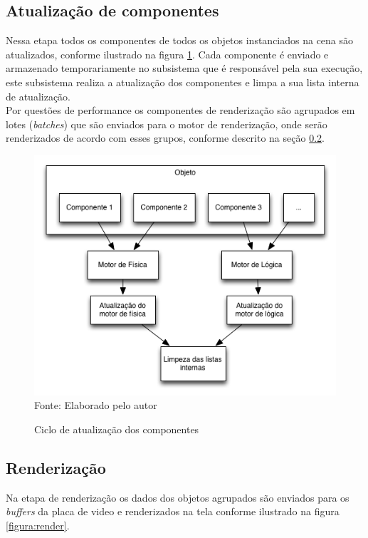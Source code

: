 \documentclass[12pt,	openright, twoside,	a4paper, english, french, spanish, brazil]{abntex2}
\begin{document}
\subsection{Atualização de componentes}
Nessa etapa todos os componentes de todos os objetos instanciados na cena são atualizados, conforme ilustrado na figura \ref{figura:update}. Cada componente é enviado e armazenado temporariamente no subsistema que é responsável pela sua execução, este subsistema realiza a atualização dos componentes e limpa a sua lista interna de atualização. \\
Por questões de performance os componentes de renderização são agrupados em lotes (\textit{batches}) que são enviados para o motor de renderização, onde serão renderizados de acordo com esses grupos, conforme descrito na seção \ref{sec: renderizacao}.

\begin{figure}[H]
\centering
\caption{Ciclo de atualização dos componentes}
\includegraphics[width=12cm]{imagens/update.png}
\\
\small{Fonte: Elaborado pelo autor}
\label{figura:update}
\end{figure}

\subsection{Renderização}  \label{sec: renderizacao}
Na etapa de renderização os dados dos objetos agrupados são enviados para os \textit{buffers} da placa de video e renderizados na tela conforme ilustrado na figura \ref{figura:render}.
\end{document}
